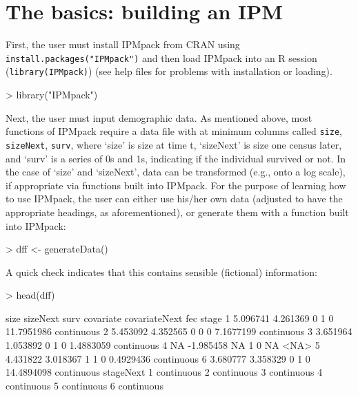 \documentclass{article}
\begin{document}
\section{The basics: building an IPM}

First, the user must install IPMpack from CRAN using
{\tt install.packages("IPMpack")} and then load IPMpack into an R session
({\tt library(IPMpack)}) (see help files for problems with installation or loading). 

\begin{Schunk}
\begin{Sinput}
> library("IPMpack")
\end{Sinput}
\end{Schunk}
Next, the user must input demographic data. As mentioned above, most functions of IPMpack require a data file with at minimum columns called {\tt size}, {\tt sizeNext}, {\tt surv}, where `size' is size at time t, `sizeNext' is size one census later, and `surv' is a series of 0s and 1s, indicating if the individual survived or not. In the case of `size' and `sizeNext', data can be transformed (e.g., onto a log scale), if appropriate via functions built into IPMpack. For the purpose of learning how to use IPMpack, the user can either use his/her own data (adjusted to have the appropriate headings, as aforementioned), or generate them with a function built into IPMpack:

\begin{Schunk}
\begin{Sinput}
> dff <- generateData()
\end{Sinput}
\end{Schunk}
A quick check indicates that this contains sensible (fictional) information: 
\begin{Schunk}
\begin{Sinput}
> head(dff)
\end{Sinput}
\begin{Soutput}
      size  sizeNext surv covariate covariateNext        fec      stage
1 5.096741  4.261369    0         1             0 11.7951986 continuous
2 5.453092  4.352565    0         0             0  7.1677199 continuous
3 3.651964  1.053892    0         1             0  1.4883059 continuous
4       NA -1.985458   NA         1             0         NA       <NA>
5 4.431822  3.018367    1         1             0  0.4929436 continuous
6 3.680777  3.358329    0         1             0 14.4894098 continuous
   stageNext
1 continuous
2 continuous
3 continuous
4 continuous
5 continuous
6 continuous
\end{Soutput}
\end{Schunk}
\end{document}
